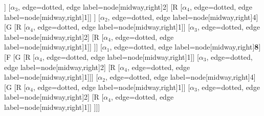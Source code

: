 \begin{forest}
[B
	[F
		[G
			[R
				[$\alpha_{4}$, edge=dotted, edge label={node[midway,right]{1}}]]
			[$\alpha_{3}$, edge=dotted, edge label={node[midway,right]{2}}]
			[R
				[$\alpha_{4}$, edge=dotted, edge label={node[midway,right]{1}}]]
		]
		[$\alpha_{2}$, edge=dotted, edge label={node[midway,right]{4}}]
		[G
			[R
				[$\alpha_{4}$, edge=dotted, edge label={node[midway,right]{1}}]]
			[$\alpha_{3}$, edge=dotted, edge label={node[midway,right]{2}}]
			[R
				[$\alpha_{4}$, edge=dotted, edge label={node[midway,right]{1}}]]
		]]
	[$\alpha_{1}$, edge=dotted, edge label={node[midway,right]{\textbf{8}}}]
	[F
		[G
			[R
				[$\alpha_{4}$, edge=dotted, edge label={node[midway,right]{1}}]]
			[$\alpha_{3}$, edge=dotted, edge label={node[midway,right]{2}}]
			[R
				[$\alpha_{4}$, edge=dotted, edge label={node[midway,right]{1}}]]]
		[$\alpha_{2}$, edge=dotted, edge label={node[midway,right]{4}}]
		[G
			[R
				[$\alpha_{4}$, edge=dotted, edge label={node[midway,right]{1}}]]
			[$\alpha_{3}$, edge=dotted, edge label={node[midway,right]{2}}]
			[R
				[$\alpha_{4}$, edge=dotted, edge label={node[midway,right]{1}}]]
	]]]
\end{forest}

